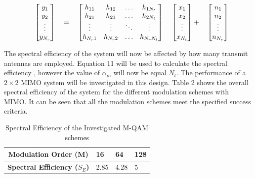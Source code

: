 \documentclass[pdftex,11pt,a4paper]{article}
\begin{document}
\begin{equation}
\quad
\begin{bmatrix}
y_1  \\
y_2  \\
\vdots \\
y_{N_r}
\end{bmatrix}
\quad =	\quad
	\begin{bmatrix}
	h_{11} & h_{12} & \ldots &h_{1N_t}\\
	h_{21} & h_{21} & \ldots &h_{2N_t} \\
	\vdots  & \vdots & \ddots& \vdots \\
	h_{N_r 1} &h_{N_r 2} & \ldots&h_{N_r N_t}
	\end{bmatrix}
	\quad \\
	\quad
	\begin{bmatrix}
	x_1  \\
	x_2  \\
	\vdots \\
	x_{N_t}
	\end{bmatrix} + \quad
	\begin{bmatrix}
	n_1  \\
	n_2  \\
	\vdots \\
	n_{N_r}
	\end{bmatrix}
\end{equation}

The spectral efficiency of the system will now be affected by how many transmit antennas are employed. Equation 11 will be used to calculate the spectral efficiency , however the value of \(\alpha_m\) will now be equal \(N_t\). The performance of a  \(2\times2\) MIMO system will be investigated in this design. Table 2 shows the overall spectral efficiency of the system for the different modulation schemes with MIMO. It can be seen that all the modulation schemes meet the specified success criteria.

\begin{table}[h!]
	\centering
	\caption{Spectral Efficiency of the Investigated M-QAM schemes}
	\label{1}
	\begin{tabular}{|c|l|l|l|}
		\hline
		\textbf{Modulation Order (M)}      & 16   & 64   & 128 \\ \hline
		\textbf{Spectral Efficiency ($S_E$)} & 2.85 & 4.28 & 5   \\ \hline
	\end{tabular}
\end{table}
\end{document}
